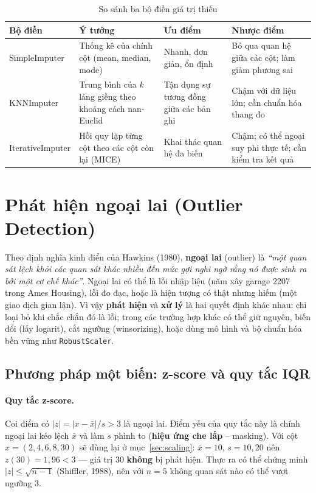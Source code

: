 \begin{table}[H]
\centering
\begin{tabular}{|p{3.1cm}|p{3.7cm}|p{3cm}|p{3.6cm}|}
\hline
\textbf{Bộ điền} & \textbf{Ý tưởng} & \textbf{Ưu điểm} & \textbf{Nhược điểm} \\
\hline
SimpleImputer & Thống kê của chính cột (mean, median, mode) & Nhanh, đơn giản, ổn định & Bỏ qua quan hệ giữa các cột; làm giảm phương sai \\ \hline
KNNImputer & Trung bình của $k$ láng giềng theo khoảng cách nan-Euclid & Tận dụng sự tương đồng giữa các bản ghi & Chậm với dữ liệu lớn; cần chuẩn hóa thang đo \\ \hline
IterativeImputer & Hồi quy lặp từng cột theo các cột còn lại (MICE) & Khai thác quan hệ đa biến & Chậm; có thể ngoại suy phi thực tế; cần kiểm tra kết quả \\ \hline
\end{tabular}
\caption{So sánh ba bộ điền giá trị thiếu}
\label{tab:imputers}
\end{table}

\section{Phát hiện ngoại lai (Outlier Detection)}
\label{sec:outlier}

Theo định nghĩa kinh điển của Hawkins (1980), \textbf{ngoại lai} (outlier) là \textit{``một quan sát lệch khỏi các quan sát khác nhiều đến mức gợi nghi ngờ rằng nó được sinh ra bởi một cơ chế khác''}. Ngoại lai có thể là lỗi nhập liệu (năm xây garage 2207 trong Ames Housing), lỗi đo đạc, hoặc là hiện tượng có thật nhưng hiếm (một giao dịch gian lận). Vì vậy \textbf{phát hiện} và \textbf{xử lý} là hai quyết định khác nhau: chỉ loại bỏ khi chắc chắn đó là lỗi; trong các trường hợp khác có thể giữ nguyên, biến đổi (lấy logarit), cắt ngưỡng (winsorizing), hoặc dùng mô hình và bộ chuẩn hóa bền vững như \texttt{RobustScaler}.

\subsection{Phương pháp một biến: z-score và quy tắc IQR}

\paragraph{Quy tắc z-score.} Coi điểm có $|z| = |x - \bar{x}|/s > 3$ là ngoại lai. Điểm yếu của quy tắc này là chính ngoại lai kéo lệch $\bar{x}$ và làm $s$ phình to (\textbf{hiệu ứng che lấp} -- masking). Với cột $x = (2, 4, 6, 8, 30)$ sẽ dùng lại ở mục~\ref{sec:scaling}: $\bar{x} = 10$, $s = 10{,}20$ nên $z(30) = 1{,}96 < 3$ --- giá trị 30 \textbf{không} bị phát hiện. Thực ra có thể chứng minh $|z| \leq \sqrt{n - 1}$ (Shiffler, 1988), nên với $n = 5$ không quan sát nào có thể vượt ngưỡng 3.

